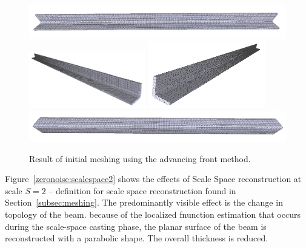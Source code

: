 \documentclass[12pt]{drexelthesis}
\begin{document}
\begin{figure}[!ht]
	
	\centering
		\includegraphics[width=5in]{simulated-lab-scan/0noise/cleanNeat/advancingfront00.png}
		\includegraphics[width=2in]{simulated-lab-scan/0noise/cleanNeat/advancingfront01.png}
		\includegraphics[width=2in]{simulated-lab-scan/0noise/cleanNeat/advancingfront02.png}
		\includegraphics[width=5in]{simulated-lab-scan/0noise/cleanNeat/advancingfront03.png}
		\caption[Initial meshing using a raw advancing front approach]{\centering  Result of initial meshing using the advancing front method.}
		\label{zeronoise:advancingfront}
\end{figure}

Figure~\ref{zeronoise:scalespace2} shows the effects of Scale Space reconstruction at scale $S = 2$ -- definition for scale space reconstruction found in Section~\ref{subsec:meshing}. The predominantly visible effect is the change in topology of the beam. because of the localized fnunction estimation that occurs during the scale-space casting phase, the planar surface of the beam is reconstructed with a parabolic shape. The overall thickness is reduced.
\end{document}
